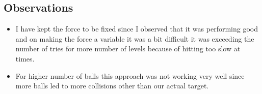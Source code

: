 \documentclass{article}
\begin{document}
\subsection{Observations}

\begin{itemize}
\item I have kept the force to be fixed since I observed that it was performing good and on making the force a variable it was a bit difficult it was exceeding the number of tries for more number of levels because of hitting too slow at times.

\item For higher number of balls this approach was not working very well since more balls led to more collisions other than our actual target.
\end{itemize}
\end{document}
